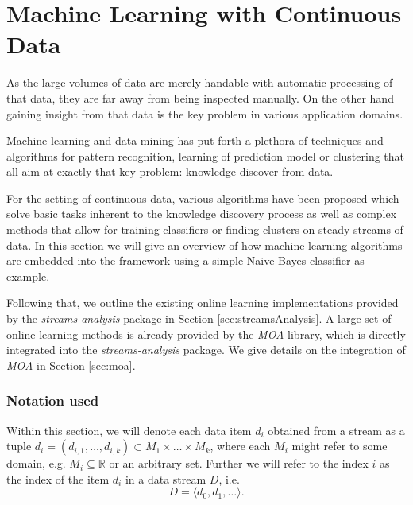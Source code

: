 \clearpage
\section{\label{sec:machineLearning}Machine Learning with Continuous Data}
As the large volumes of data are merely handable with automatic
processing of that data, they are far away from being inspected
manually. On the other hand gaining insight from that data is the key
problem in various application domains.

Machine learning and data mining has put forth a plethora of
techniques and algorithms for pattern recognition, learning of
prediction model or clustering that all aim at exactly that key
problem: knowledge discover from data.

For the setting of continuous data, various algorithms have been
proposed which solve basic tasks inherent to the knowledge discovery
process as well as complex methods that allow for training classifiers
or finding clusters on steady streams of data. In this section we will
give an overview of how machine learning algorithms are embedded into
the \streams framework using a simple Naive Bayes classifier as example.

Following that, we outline the existing online learning implementations
provided by the {\em streams-analysis} package in Section \ref{sec:streamsAnalysis}.
A large set of online learning methods is already provided by the {\em MOA}
library, which is directly integrated into the {\em streams-analysis} package.
We give details on the integration of {\em MOA} in Section \ref{sec:moa}.


\subsubsection*{Notation used}
Within this section, we will denote each data item $d_i$ obtained from
a stream as a tuple $d_i = (d_{i,1},\ldots,d_{i,k}) \subset
M_1\times\ldots\times M_k$, where each $M_i$ might refer to some
domain, e.g. $M_i \subseteq \mathbb{R}$ or an arbitrary set. Further
we will refer to the index $i$ as the index of the item $d_i$ in a
data stream $D$, i.e.
\begin{displaymath}
  D = \langle d_0,d_1,\ldots \rangle.
\end{displaymath}


